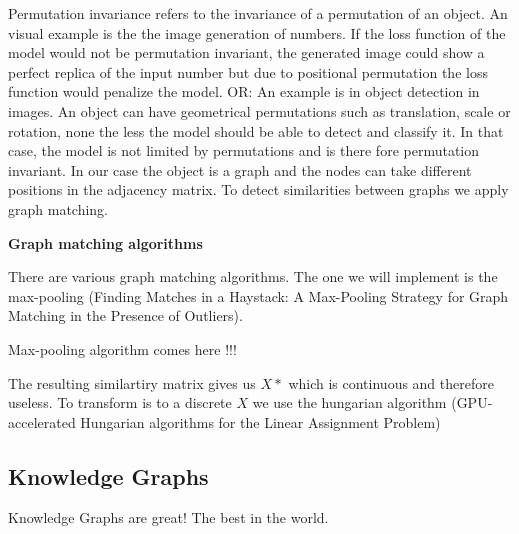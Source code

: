 
Permutation invariance refers to the invariance of a permutation of an object. An visual example is the the image generation of numbers. If the loss function of the model would not be permutation invariant, the generated image could show a perfect replica of the input number but due to positional permutation the loss function would penalize the model. 
OR: An example is in object detection in images. An object can have geometrical permutations such as translation, scale or rotation, none the less the model should be able to detect and classify it. In that case, the model is not limited by permutations and  is there fore permutation invariant.
In our case the object is a graph and the nodes can take different positions in the adjacency matrix. To detect similarities between graphs we apply graph matching.

\textbf{Graph matching algorithms}

There are various graph matching algorithms. The one we will implement is the max-pooling (Finding Matches in a Haystack: A Max-Pooling Strategy for Graph Matching in the Presence of Outliers). 

Max-pooling algorithm comes here !!!

The resulting similartiry matrix gives us $X*$ which is continuous and therefore useless. To transform is to a discrete $X$ we use the hungarian algorithm (GPU-accelerated Hungarian algorithms for the Linear
Assignment Problem)


\subsection{Knowledge Graphs}

Knowledge Graphs are great! The best in the world.
